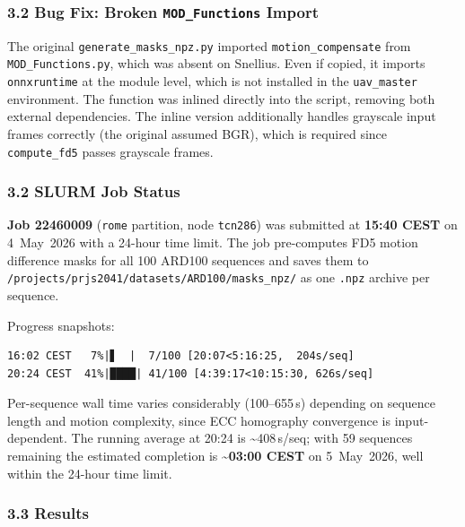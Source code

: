 \subsubsection*{3.2 Bug Fix: Broken \texttt{MOD\_Functions} Import}

The original \texttt{generate\_masks\_npz.py} imported
\texttt{motion\_compensate} from \texttt{MOD\_Functions.py}, which
was absent on Snellius. Even if copied, it imports \texttt{onnxruntime}
at the module level, which is not installed in the \texttt{uav\_master}
environment. The function was inlined directly into the script,
removing both external dependencies. The inline version additionally
handles grayscale input frames correctly (the original assumed BGR),
which is required since \texttt{compute\_fd5} passes grayscale frames.

\subsubsection*{3.2 SLURM Job Status}

\textbf{Job 22460009} (\texttt{rome} partition, node \texttt{tcn286})
was submitted at \textbf{15:40 CEST} on 4~May~2026 with a 24-hour
time limit. The job pre-computes FD5 motion difference masks for all
100 ARD100 sequences and saves them to
\texttt{/projects/prjs2041/datasets/ARD100/masks\_npz/} as one
\texttt{.npz} archive per sequence.

Progress snapshots:

\begin{verbatim}
16:02 CEST   7%|▋  |  7/100 [20:07<5:16:25,  204s/seq]
20:24 CEST  41%|████| 41/100 [4:39:17<10:15:30, 626s/seq]
\end{verbatim}

\noindent Per-sequence wall time varies considerably (100--655\,s)
depending on sequence length and motion complexity, since ECC
homography convergence is input-dependent. The running average at
20:24 is \textasciitilde{}408\,s/seq; with 59 sequences remaining
the estimated completion is \textasciitilde{}\textbf{03:00 CEST}
on 5~May~2026, well within the 24-hour time limit.

\subsubsection*{3.3 Results}

